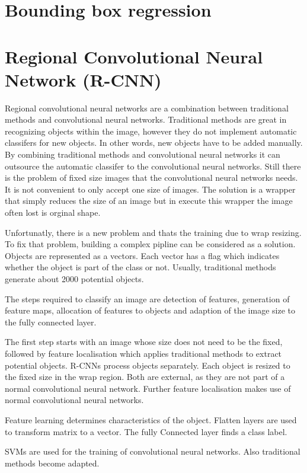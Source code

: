 \documentclass[a4paper,13pt,twoside]{book}
\begin{document}
\section{Bounding box regression}

\section{Regional Convolutional Neural Network (R-CNN)}

Regional convolutional neural networks are a combination between traditional methods and convolutional neural networks.
Traditional methods are great in recognizing objects within the image, however they do not implement automatic classifers for new objects. In other words, new objects have to be added manually. By combining traditional methods and convolutional neural networks it can outsource the automatic classifer to the convolutional neural networks. Still there is the problem of fixed size images that the convolutional neural networks needs. It is not convenient to only accept one size of images. The solution is a wrapper that simply reduces the size of an image but in execute this wrapper the image often lost is orginal shape.

Unfortunatly, there is a new problem and thats the training due to wrap resizing. To fix that problem, building a complex pipline can be considered as a solution. Objects are represented as a vectors. Each vector has a flag which indicates whether the object is part of the class or not. Usually, traditional methods generate about 2000 potential objects.

The steps required to classify an image are detection of features, generation of feature maps, allocation of features to objects and adaption of the image size to the fully connected layer.

The first step starts with an image whose size does not need to be the fixed, followed by feature localisation which applies traditional methods to extract potential objects. R-CNNs process objects separately. Each object is resized to the fixed size in the wrap region. Both are external, as they are not part of a normal convolutional neural network. Further feature localisation makes use of normal convolutional neural networks.

Feature learning determines characteristics of the object. Flatten layers are used to transform matrix to a vector. The fully Connected layer finds a class label.

SVMs are used for the training of convolutional neural networks. Also traditional methods become adapted.
\end{document}
